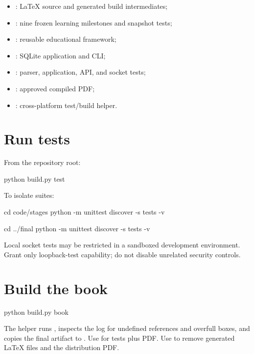 \begin{itemize}
  \item {}: LaTeX source and generated build intermediates;
  \item {}: nine frozen learning milestones and snapshot tests;
  \item {}: reusable educational framework;
  \item {}: SQLite application and CLI;
  \item {}: parser, application, API, and socket tests;
  \item {}: approved compiled PDF;
  \item {}: cross-platform test/build helper.
\end{itemize}

\section{Run tests}

From the repository root:

\begin{wiremessage}
python build.py test
\end{wiremessage}

To isolate suites:

\begin{wiremessage}
cd code/stages
python -m unittest discover -s tests -v

cd ../final
python -m unittest discover -s tests -v
\end{wiremessage}

Local socket tests may be restricted in a sandboxed development environment.
Grant only loopback-test capability; do not disable unrelated security controls.

\section{Build the book}

\begin{wiremessage}
python build.py book
\end{wiremessage}

The helper runs , inspects the log for undefined references
and overfull boxes, and copies the final artifact to
. Use  for
tests plus PDF. Use  to remove generated LaTeX files
and the distribution PDF.

